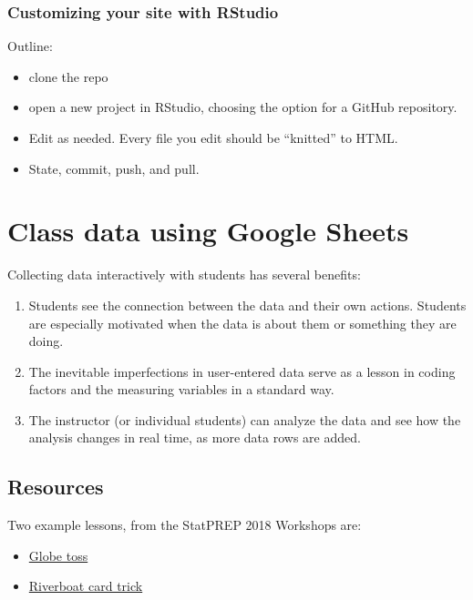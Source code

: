 \documentclass[]{book}
\providecommand{\tightlist}{%
  \setlength{\itemsep}{0pt}\setlength{\parskip}{0pt}}
\theoremstyle{definition}
\theoremstyle{definition}
\theoremstyle{definition}
\theoremstyle{remark}
\begin{document}
\subsection{Customizing your site with
RStudio}\label{customizing-your-site-with-rstudio}

Outline:

\begin{itemize}
\tightlist
\item
  clone the repo
\item
  open a new project in RStudio, choosing the option for a GitHub
  repository.
\item
  Edit as needed. Every file you edit should be ``knitted'' to HTML.
\item
  State, commit, push, and pull.
\end{itemize}

\chapter{Class data using Google
Sheets}\label{class-data-using-google-sheets}

Collecting data interactively with students has several benefits:

\begin{enumerate}
\def\labelenumi{\arabic{enumi}.}
\tightlist
\item
  Students see the connection between the data and their own actions.
  Students are especially motivated when the data is about them or
  something they are doing.
\item
  The inevitable imperfections in user-entered data serve as a lesson in
  coding factors and the measuring variables in a standard way.
\item
  The instructor (or individual students) can analyze the data and see
  how the analysis changes in real time, as more data rows are added.
\end{enumerate}

\section{Resources}\label{resources}

Two example lessons, from the StatPREP 2018 Workshops are:

\begin{itemize}
\tightlist
\item
  \href{http://dtkaplan.shinyapps.io/tutorial_globe_toss.png}{Globe
  toss}
\item
  \href{http://dtkaplan.shinyapps.io/Tutorial_Riverboat_shuffle.png}{Riverboat
  card trick}
\end{itemize}
\end{document}
